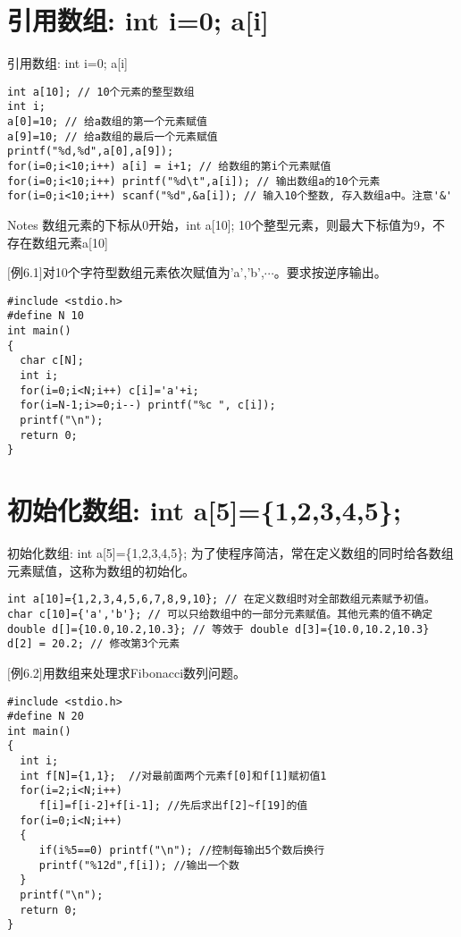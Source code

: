 \section{引用数组: int i=0; a[i]}

\begin{frame}{引用数组: int i=0; a[i]}
\begin{lstlisting}
int a[10]; // 10个元素的整型数组
int i;
a[0]=10; // 给a数组的第一个元素赋值
a[9]=10; // 给a数组的最后一个元素赋值
printf("%d,%d",a[0],a[9]);
for(i=0;i<10;i++) a[i] = i+1; // 给数组的第i个元素赋值
for(i=0;i<10;i++) printf("%d\t",a[i]); // 输出数组a的10个元素
for(i=0;i<10;i++) scanf("%d",&a[i]); // 输入10个整数, 存入数组a中。注意'&'
\end{lstlisting}
\begin{block}{Notes}
	数组元素的下标从0开始，int a[10]; 10个整型元素，则最大下标值为9，不存在数组元素a[10]
\end{block}
\end{frame}

\begin{frame}
$[$例6.1$]$对10个字符型数组元素依次赋值为'a','b',$\cdots$。要求按逆序输出。
\pause
\begin{lstlisting}
#include <stdio.h>
#define N 10
int main()
{
  char c[N];
  int i;
  for(i=0;i<N;i++) c[i]='a'+i; 
  for(i=N-1;i>=0;i--) printf("%c ", c[i]);
  printf("\n");
  return 0;
}
\end{lstlisting}
\end{frame}

\section{初始化数组: int a[5]=\{1,2,3,4,5\};}

\begin{frame}{初始化数组: int a[5]=\{1,2,3,4,5\};}
为了使程序简洁，常在定义数组的同时给各数组元素赋值，这称为数组的初始化。
\begin{lstlisting}
int a[10]={1,2,3,4,5,6,7,8,9,10}; // 在定义数组时对全部数组元素赋予初值。
char c[10]={'a','b'}; // 可以只给数组中的一部分元素赋值。其他元素的值不确定
double d[]={10.0,10.2,10.3}; // 等效于 double d[3]={10.0,10.2,10.3}
d[2] = 20.2; // 修改第3个元素
\end{lstlisting}
\end{frame}

\begin{frame}
$[$例6.2$]$用数组来处理求Fibonacci数列问题。
\begin{lstlisting}
#include <stdio.h>
#define N 20
int main()
{
  int i;
  int f[N]={1,1};  //对最前面两个元素f[0]和f[1]赋初值1
  for(i=2;i<N;i++)
     f[i]=f[i-2]+f[i-1]; //先后求出f[2]~f[19]的值
  for(i=0;i<N;i++)
  {
     if(i%5==0) printf("\n"); //控制每输出5个数后换行
     printf("%12d",f[i]); //输出一个数
  }
  printf("\n");
  return 0;
}
\end{lstlisting}
\end{frame}

